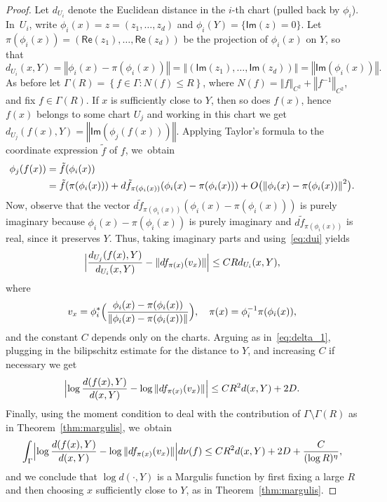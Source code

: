 \documentclass[11pt]{article}
\let\sep :
\newcommand{\set}[1]{\left\{#1\right\}}
\newcommand{\norm}[1]{{\left\Vert#1\right\Vert}}
\newcommand{\anorm}[1]{{\Vert#1\Vert}}
\newcommand{\Babs}[1]{\Bigl\vert#1\Bigr\vert}
\newcommand{\blrpar}[1]{\bigl(#1\bigr)}
\newcommand{\Blrpar}[1]{\Bigl(#1\Bigr)}
\newcommand{\inv}{^{-1}}
\newcommand{\Ima}{{\mathsf{Im}}}
\newcommand{\Rea}{{\mathsf{Re}}}
\theoremstyle{plain}
\theoremstyle{definition}
\numberwithin{equation}{section}
\begin{document}
\begin{proof}
Let $d_{U_i}$ denote the Euclidean distance in the $i$-th chart (pulled back by $\phi_i$). In~$U_i$, write
$\phi_i(x) = z = (z_1, \ldots, z_d)$ and $\phi_i(Y) = \{\Ima (z) = 0\}$.
Let $\pi(\phi_i(x)) = (\Rea(z_1), \ldots , \Rea(z_d))$ be the projection of $\phi_i(x)$ on $Y$,
so that
\begin{equation} \label{eq:dui}
d_{U_i}(x,Y) = \norm{ \phi_i(x) - \pi(\phi_i(x))} = \norm{(\Ima (z_1), \ldots , \Ima (z_d))} = \norm{\Ima(\phi_i(x))}.
\end{equation}
As before let $\Gamma(R) = \set{f\in \Gamma \sep N(f)\leq R}$, where
$N(f) = \norm{f}_{C^2} + \norm{f\inv}_{C^2}$,
and fix $f\in \Gamma(R)$. If $x$ is sufficiently close to $Y$, then so does $f(x)$, hence
$f(x)$ belongs to some chart $U_j$ and working in this chart we get
$d_{U_j}(f(x),Y) = \norm{\Ima(\phi_j(f(x)))}$.
Applying Taylor's formula to the coordinate expression $\tilde f$ of $f$, we~obtain
\begin{align*}
\notag \phi_j(f(x)) &= \tilde f(\phi_i(x)) \\& \notag = \tilde f (\pi( \phi_i(x))) + d \tilde f_{\pi( \phi_i(x))} (\phi_i(x) - \pi( \phi_i(x)))
+ O\blrpar{ \norm{ \phi_i(x) - \pi(\phi_i(x))}^2}.
\end{align*}
Now, observe that the vector $d \tilde f_{\pi( \phi_i(x))} (\phi_i(x) - \pi( \phi_i(x)))$ is purely imaginary
because $\phi_i(x) - \pi( \phi_i(x))$ is purely imaginary and $d \tilde f_{\pi( \phi_i(x))}$ is real,
since it preserves $Y$.
Thus, taking imaginary parts and using~\eqref{eq:dui} yields
\begin{equation*}
\Babs{ \frac{d_{U_j}(f(x), Y)}{d_{U_i}(x, Y) }- \anorm{df_{\pi( x)}(v_x) }}\leq C R d_{U_i}(x, Y),
\end{equation*}
where
\[
v_x = \phi_i^\varstar\Blrpar{\frac{\phi_i(x) - \pi( \phi_i(x))}{\norm{\phi_i(x) - \pi( \phi_i(x))}}},\quad
\pi(x) = \phi_i\inv \pi( \phi_i(x)),
\]
and the constant $C$ depends only on the charts.
Arguing as in~\eqref{eq:delta_1}, plugging in the bilipschitz estimate for the distance to $Y$, and increasing $C$ if necessary we get
\begin{equation*}
\Babs{\log \frac{d (f(x), Y)}{d (x, Y) }- \log \anorm{df_{\pi( x)}(v_x) }}\leq C R^2 d(x, Y) + 2D.
\end{equation*}
Finally, using the moment condition to deal
with the contribution of $\Gamma\setminus \Gamma(R)$ as in Theorem~\ref{thm:margulis}, we~obtain
\begin{equation*}
\int_\Gamma
\Babs{\log \frac{d(f(x), Y)}{d(x, Y) }- \log \anorm{df_{\pi(x)}(v_x) }} d\nu(f) \leq C R^2 d(x, Y)
+ 2D + \frac{C}{(\log R)^\eta},
\end{equation*}
and we conclude that $\log d(\cdot , Y)$ is a Margulis function by first fixing a large $R$ and then choosing
$x$ sufficiently close to $Y$, as in Theorem~\ref{thm:margulis}.
\end{proof}
\end{document}
